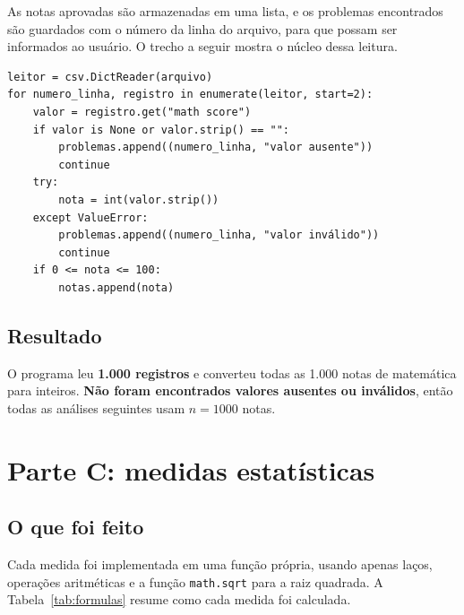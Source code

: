 \documentclass[12pt,a4paper]{article}
\begin{document}
As notas aprovadas são armazenadas em uma lista, e os problemas encontrados são guardados com o número da linha do arquivo, para que possam ser informados ao usuário. O trecho a seguir mostra o núcleo dessa leitura.

\noindent\begin{minipage}{\linewidth}
\begin{lstlisting}
leitor = csv.DictReader(arquivo)
for numero_linha, registro in enumerate(leitor, start=2):
    valor = registro.get("math score")
    if valor is None or valor.strip() == "":
        problemas.append((numero_linha, "valor ausente"))
        continue
    try:
        nota = int(valor.strip())
    except ValueError:
        problemas.append((numero_linha, "valor inválido"))
        continue
    if 0 <= nota <= 100:
        notas.append(nota)
\end{lstlisting}
\end{minipage}

\subsection{Resultado}

O programa leu \textbf{1.000 registros} e converteu todas as 1.000 notas de matemática para inteiros. \textbf{Não foram encontrados valores ausentes ou inválidos}, então todas as análises seguintes usam $n = 1000$ notas.

\section{Parte C: medidas estatísticas}\label{sec:c}

\subsection{O que foi feito}

Cada medida foi implementada em uma função própria, usando apenas laços, operações aritméticas e a função \texttt{math.sqrt} para a raiz quadrada. A Tabela~\ref{tab:formulas} resume como cada medida foi calculada.
\end{document}
